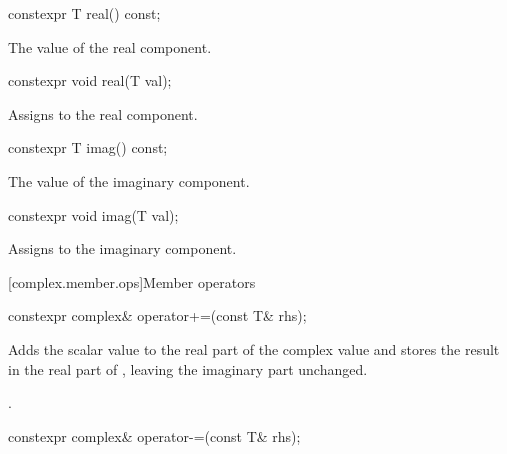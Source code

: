 %
\begin{itemdecl}
constexpr T real() const;
\end{itemdecl}

\begin{itemdescr}
\pnum
\returns
The value of the real component.
\end{itemdescr}

%
\begin{itemdecl}
constexpr void real(T val);
\end{itemdecl}

\begin{itemdescr}
\pnum
\effects
Assigns  to the real component.
\end{itemdescr}

%
\begin{itemdecl}
constexpr T imag() const;
\end{itemdecl}

\begin{itemdescr}
\pnum
\returns
The value of the imaginary component.
\end{itemdescr}

%
\begin{itemdecl}
constexpr void imag(T val);
\end{itemdecl}

\begin{itemdescr}
\pnum
\effects
Assigns  to the imaginary component.
\end{itemdescr}

[complex.member.ops]{Member operators}

%
\begin{itemdecl}
constexpr complex& operator+=(const T& rhs);
\end{itemdecl}

\begin{itemdescr}
\pnum
\effects
Adds the scalar value  to the real part of the complex value
and stores the result in the real part of
,
leaving the imaginary part unchanged.

\pnum
\returns
{}.
\end{itemdescr}

%
\begin{itemdecl}
constexpr complex& operator-=(const T& rhs);
\end{itemdecl}

